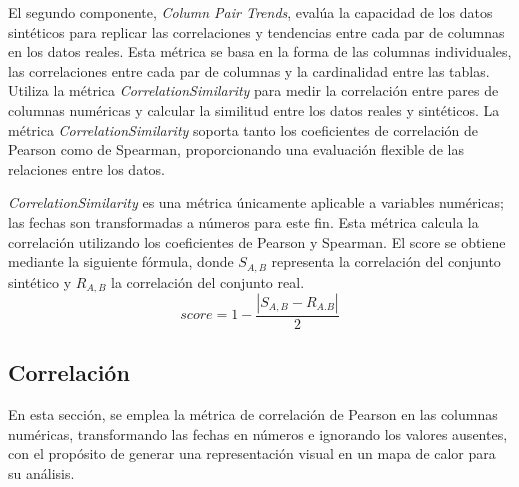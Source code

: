 El segundo componente, \emph{Column Pair Trends}, evalúa la capacidad de los datos sintéticos para replicar las correlaciones y tendencias entre cada par de columnas en los datos reales. Esta métrica se basa en la forma de las columnas individuales, las correlaciones entre cada par de columnas y la cardinalidad entre las tablas. Utiliza la métrica \emph{CorrelationSimilarity} para medir la correlación entre pares de columnas numéricas y calcular la similitud entre los datos reales y sintéticos. La métrica \emph{CorrelationSimilarity} soporta tanto los coeficientes de correlación de Pearson como de Spearman, proporcionando una evaluación flexible de las relaciones entre los datos.


\emph{CorrelationSimilarity} es una métrica únicamente aplicable a variables numéricas; las fechas son transformadas a números para este fin. Esta métrica calcula la correlación utilizando los coeficientes de Pearson y Spearman. El score se obtiene mediante la siguiente fórmula, donde $S_{A,B}$ representa la correlación del conjunto sintético y $R_{A,B}$ la correlación del conjunto real.
\[
score = 1 - \frac{|S_{A,B} - R_{A.B}|}{2}
\]


\subsection{Correlación}
En esta sección, se emplea la métrica de correlación de Pearson en las columnas numéricas, transformando las fechas en números e ignorando los valores ausentes, con el propósito de generar una representación visual en un mapa de calor para su análisis.

